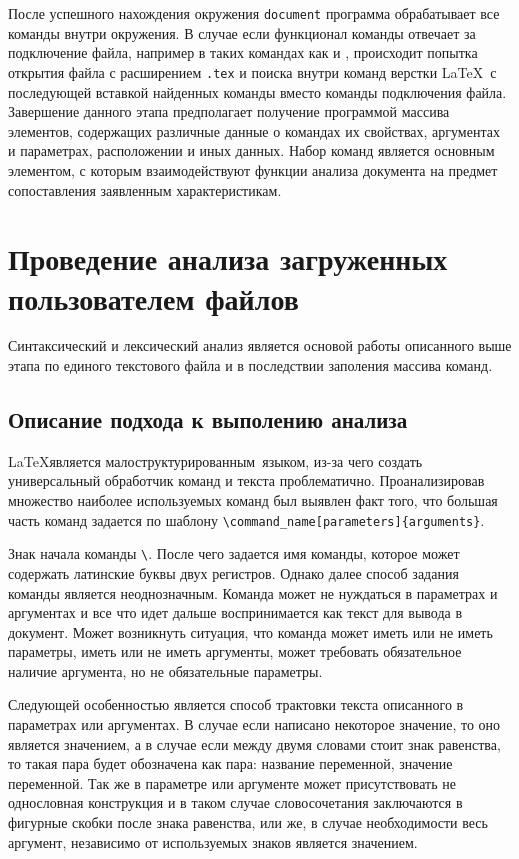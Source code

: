 После успешного нахождения окружения \verb|document| программа обрабатывает все команды внутри окружения. В случае если функционал команды отвечает за подключение файла, например в таких командах как \verb|| и \verb||, происходит попытка открытия файла с расширением \verb|.tex| и поиска внутри команд верстки \LaTeX \, с последующей вставкой найденных команды вместо команды подключения файла. Завершение данного этапа предполагает получение программой массива элементов, содержащих различные данные о командах их свойствах, аргументах и параметрах, расположении и иных данных. Набор команд является основным элементом, с которым взаимодействуют функции анализа документа на предмет сопоставления заявленным характеристикам. 


\section{Проведение анализа загруженных пользователем файлов}

Синтаксический и лексический анализ является основой работы описанного выше этапа по единого текстового файла и в последствии заполения массива команд. 
\subsection{Описание подхода к выполению анализа}

\LaTeX является \guillemotleft малоструктурированным\guillemotright \ языком, из-за чего создать универсальный обработчик команд и текста проблематично. Проанализировав множество наиболее используемых команд был выявлен факт того, что большая часть команд задается по шаблону 
 \verb|\command_name[parameters]{arguments}|.
 
Знак начала команды \verb|\|. После чего задается имя команды, которое может содержать латинские буквы двух регистров. Однако далее способ задания команды является неоднозначным. Команда может не нуждаться в параметрах и аргументах и все что идет дальше воспринимается как текст для вывода в документ. Может возникнуть ситуация, что команда может иметь или не иметь параметры, иметь или не иметь аргументы, может требовать обязательное наличие аргумента, но не обязательные параметры.

Следующей особенностью является способ трактовки текста описанного в параметрах или аргументах. В случае если написано некоторое значение, то оно является значением, а в случае если между двумя словами стоит знак равенства, то такая пара будет обозначена как пара: название переменной, значение переменной. Так же в параметре или аргументе может присутствовать не однословная конструкция и в таком случае словосочетания заключаются в фигурные скобки после знака равенства, или же, в случае необходимости весь аргумент, независимо от используемых знаков является значением.

